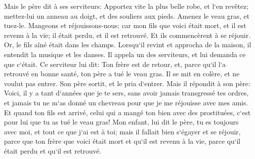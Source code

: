 \verse Mais le père dit à ses serviteurs: Apportez vite la plus belle robe, et l`en revêtez; mettez-lui un anneau au doigt, et des souliers aux pieds. 
\verse Amenez le veau gras, et tuez-le. Mangeons et réjouissons-nous; 
\verse car mon fils que voici était mort, et il est revenu à la vie; il était perdu, et il est retrouvé. Et ils commencèrent à se réjouir. 
\verse Or, le fils aîné était dans les champs. Lorsqu`il revint et approcha de la maison, il entendit la musique et les danses. 
\verse Il appela un des serviteurs, et lui demanda ce que c`était. 
\verse Ce serviteur lui dit: Ton frère est de retour, et, parce qu`il l`a retrouvé en bonne santé, ton père a tué le veau gras. 
\verse Il se mit en colère, et ne voulut pas entrer. Son père sortit, et le pria d`entrer. 
\verse Mais il répondit à son père: Voici, il y a tant d`années que je te sers, sans avoir jamais transgressé tes ordres, et jamais tu ne m`as donné un chevreau pour que je me réjouisse avec mes amis. 
\verse Et quand ton fils est arrivé, celui qui a mangé ton bien avec des prostituées, c`est pour lui que tu as tué le veau gras! 
\verse Mon enfant, lui dit le père, tu es toujours avec moi, et tout ce que j`ai est à toi; 
\verse mais il fallait bien s`égayer et se réjouir, parce que ton frère que voici était mort et qu`il est revenu à la vie, parce qu`il était perdu et qu`il est retrouvé. 

\chapter{}

